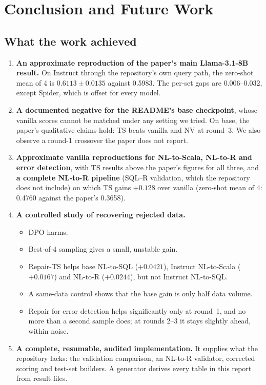\chapter{Conclusion and Future Work}\label{ch:conclusion}

\section{What the work achieved}

\begin{enumerate}
\item \textbf{An approximate reproduction of the paper's main Llama-3.1-8B result.} On Instruct through the
repository's own query path, the zero-shot mean of 4 is $0.6113\pm0.0135$ against 0.5983. The per-set gaps are
0.006--0.032, except Spider, which is offset for every model.
\item \textbf{A documented negative for the README's base checkpoint}, whose vanilla scores cannot be matched under any
setting we tried. On base, the paper's qualitative claims hold: TS beats vanilla and NV at round~3. We also observe a
round-1 crossover the paper does not report.
\item \textbf{Approximate vanilla reproductions for NL-to-Scala, NL-to-R and error detection}, with TS results above
the paper's figures for all three, and \textbf{a complete NL-to-R pipeline} (SQL--R validation, which the repository
does not include) on which TS gains $+0.128$ over vanilla (zero-shot mean of 4: 0.4760 against the paper's 0.3658).
\item \textbf{A controlled study of recovering rejected data.}
  \begin{itemize}
  \item DPO harms.
  \item Best-of-4 sampling gives a small, unstable gain.
  \item Repair-TS helps base NL-to-SQL ($+0.0421$), Instruct NL-to-Scala ($+0.0167$) and NL-to-R ($+0.0244$), but not
  Instruct NL-to-SQL.
  \item A same-data control shows that the base gain is only half data volume.
  \item Repair for error detection helps significantly only at round~1, and no more than a second sample does;
  at rounds 2--3 it stays slightly ahead, within noise.
  \end{itemize}
\item \textbf{A complete, resumable, audited implementation.} It supplies what the repository lacks: the validation
comparison, an NL-to-R validator, corrected scoring and test-set builders. A generator derives every table in this
report from result files.
\end{enumerate}

